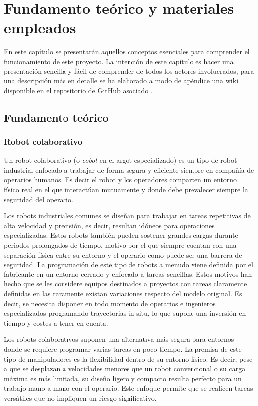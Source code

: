 \chapter{Fundamento teórico y materiales empleados} \label{cap: fundamento_teorico}
En este capítulo se presentarán aquellos conceptos esenciales para comprender el funcionamiento de este proyecto. La intención de este capítulo es hacer una presentación sencilla y fácil de comprender de todos los actores involucrados, para una descripción más en detalle se ha elaborado a modo de apéndice una wiki disponible en el \href{\linkrepositorio}{repositorio de GitHub asociado} \cite{repo_github_TFM_MiguelLerinAlonso}. 

\section{Fundamento teórico}
\subsection{Robot colaborativo}
Un robot colaborativo (o \textit{cobot} en el argot especializado) es un tipo de robot industrial enfocado a trabajar de forma segura y eficiente siempre en compañía de operarios humanos. Es decir el robot y los operadores comparten un entorno físico real en el que interactúan mutuamente y donde debe prevalecer siempre la seguridad del operario. 

Los robots industriales comunes se diseñan para trabajar en tareas repetitivas de alta velocidad y precisión, es decir, resultan idóneos para operaciones especializadas. Estos robots también pueden sostener grandes cargas durante periodos prolongados de tiempo, motivo por el que siempre cuentan con una separación física entre su entorno y el operario como puede ser una barrera de seguridad. La programación de este tipo de robots a menudo viene definida por el fabricante en un entorno cerrado y enfocado a tareas sencillas. Estos motivos han hecho que se les considere equipos destinados a proyectos con tareas claramente definidas en las raramente existan variaciones respecto del modelo original. Es decir, se necesita disponer en todo momento de operarios e ingenieros especializados programando trayectorias in-situ, lo que supone una inversión en tiempo y costes a tener en cuenta.

Los robots colaborativos suponen una alternativa más segura para entornos donde se requiere programar varias tareas en poco tiempo. La premisa de este tipo de manipuladores es la flexibilidad dentro de su entorno físico. Es decir, pese a que se desplazan a velocidades menores que un robot convencional o su carga máxima es más limitada, su diseño ligero y compacto resulta perfecto para un trabajo mano a mano con el operario. Este enfoque permite que se realicen tareas versátiles que no impliquen un riesgo significativo.

